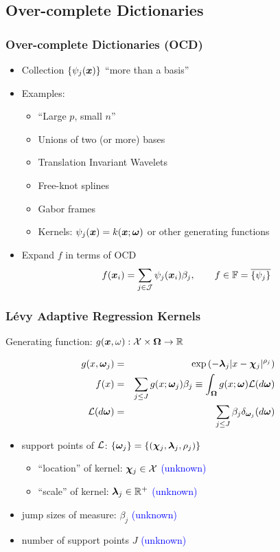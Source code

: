 \documentclass[dvips]{beamer}
\newcommand{\bs}[2]{\begin{frame} \frametitle{#1} 
{#2}
\end{frame} }
\newcommand{\blue}{\textcolor{Blue}}
\begin{document}
\subsection{Over-complete Dictionaries }

\bs{Over-complete Dictionaries (OCD)} {
\begin{itemize}
\item  Collection $\{\psi_{j}(\bm x) \}$  ``more than a basis''
  \item Examples:
    \begin{itemize}
    \item ``Large $p$, small $n$''
    \item Unions of two (or more) bases
    \item Translation Invariant Wavelets
    \item Free-knot splines
    \item Gabor frames
   \item Kernels:  $\psi_j(\bm x) = k(\bm x; \bm \omega)$ or other
     generating functions
   \end{itemize}
\item   Expand $f$ in terms of OCD  
   \[ f(\bm x_i) = \sum_{j \in \mathcal{J} } \psi_j(\bm x_i)\beta_j,\qquad f \in
   \mathbb{F}=\overline{\{\psi_{j}\}}\]
  \end{itemize} 
}

\bs{L\'evy Adaptive Regression Kernels} {
Generating function:  $g(\bm x, \omega): \mathcal{X} \times \bm \Omega \to \mathbb{R}$

\begin{eqnarray*}
g(x,\bm \omega_j) & = & \exp\left(-\bm \lambda_j|x-\bm \chi_j|^{\rho_j}\right) \\
f(x) &  = &  \sum_{j\le J}g(x; \bm \omega_j) \beta_j \equiv \int_{\bm \Omega}  
g(x;\bm \omega) {\cal L}(d\bm \omega) \\
{\cal L}(d\bm \omega) & = &\sum_{j\le J} \beta_j \delta_{\bm \omega_j}(d\bm \omega)
\end{eqnarray*}

  \begin{itemize}
  
  \item  support points of ${\cal L}$: $\{\bm \omega_j\} = \{(\bm \chi_j,\bm \lambda_j, \rho_j)
     \}$ 
    \begin{itemize}
    \item``location'' of kernel:  $\bm \chi_j\in\mathcal{X}$  \blue{(unknown)}
    \item ``scale'' of kernel:  $\bm \lambda_j\in\mathbb{R}^+$   \blue{(unknown)}
    \end{itemize} 
  \item jump sizes of measure:  $\beta_j$   \blue{(unknown)} 
  \item number of support points  $J$ \blue{(unknown)}
  \end{itemize}
} 
\end{document}
